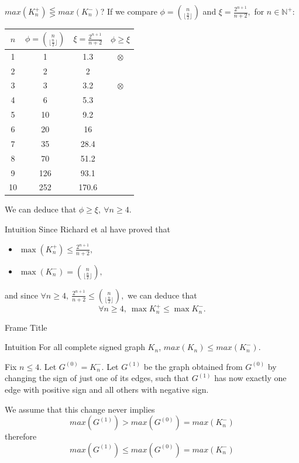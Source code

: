 \documentclass{beamer}
\newcommand{\floor}[1]{\lfloor #1 \rfloor}
\begin{document}
\begin{frame}{$max(K_n^+) \lesseqgtr max(K_n^-)$?}
    If we compare $\phi = \binom{n}{\floor{\frac{n}{2}}}$ and $\xi =\frac{2^{n+1}}{n+2},$ for $n \in \mathbb{N}^+:$
    \small{
    \begin{table}
		\begin{tabular}{c|c|c|c}
		$n$ & $\phi = \binom{n}{\floor{\frac{n}{2}}}$ &  $\xi =\frac{2^{n+1}}{n+2}$ & $\phi \geq \xi$ \\\hline
		1 & 1 & 1.3 & $\otimes$\\
		2 & 2 & 2 & \checkmark\\
		3 & 3 & 3.2 & $\otimes$\\
		4 & 6 & 5.3 &\checkmark\\
		5 & 10 & 9.2 &\checkmark\\
		6 & 20 & 16 &\checkmark\\
		7 & 35 & 28.4 & \checkmark\\
		8 & 70 & 51.2 & \checkmark\\
		9 & 126 & 93.1 & \checkmark\\
		10 & 252 & 170.6 & \checkmark\\
		\end{tabular}
	\end{table}
	}
	We can deduce that $\phi \geq \xi,\ \forall n \geq 4.$
\end{frame}

\begin{frame}{Intuition}
    Since Richard et al have proved that 
    \begin{itemize}
        \item $\max(K_n^+) \leq \frac{2^{n+1}}{n+2},$
        \item $\max(K_n^-) = \binom{n}{\floor{\frac{n}{2}}},$
    \end{itemize}
    and since $\forall n\geq 4,\ \frac{2^{n+1}}{n+2} \leq \binom{n}{\floor{\frac{n}{2}}},$ we can deduce that
    \begin{equation}
        \label{eq:maxKorder}
        \forall n\geq 4,\ \max{K_n^+} \leq \max{K_n^-}.
    \end{equation}
\end{frame}


\begin{frame}{Frame Title}
    \justifying
    \begin{exampleblock}{Intuition}
        For all complete signed graph $K_n$, $max(K_n) \leq max(K_n^-)$.
    \end{exampleblock}
    Fix $n \leq 4$. Let $G^{(0)} = K_n^-$. Let $G^{(1)}$ be the graph obtained from $G^{(0)}$ by changing the sign of just one of its edges, such that $G^{(1)}$ has now exactly one edge with positive sign and all others with negative sign.
    
    We assume that this change never implies
    \[
        max(G^{(1)}) > max(G^{(0)}) = max(K_n^-)
    \]
    therefore
    \[
        max(G^{(1)}) \leq max(G^{(0)}) = max(K_n^-)
    \]
\end{frame}
\end{document}
